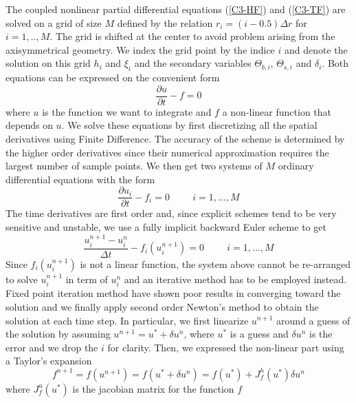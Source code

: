 The coupled nonlinear partial differential equations (\ref{C3-HF}) and
(\ref{C3-TF}) are solved on a grid of size $M$ defined by the relation
$r_i = (i-0.5)\Delta r$ for $i=1,..,M$. The grid is shifted at the center to avoid
problem arising  from the axisymmetrical  geometry. We index  the grid
point by the indice $i$ and denote the solution on this grid $h_i$ and
$\xi_i$ and the secondary variables $\Theta_{b,i}$, $\Theta_{s,i}$ and
$\delta_i$. Both equations can be expressed on the convenient form
\begin{equation}
  \frac{\partial u}{\partial t} - f = 0
\end{equation}
where $u$  is the function we  want to integrate and  $f$ a non-linear
function  that depends  on $u$.   We  solve these  equations by  first
discretizing all the spatial  derivatives using Finite Difference. The
accuracy of the  scheme is determined by the  higher order derivatives
since  their numerical  approximation requires  the largest  number of
sample points. We then get  two systems of $M$ ordinary differential
equations with the form
\begin{equation}
  \frac{\partial u_i}{\partial t} - f_i = 0 \hspace{1cm} i = 1,...,M
\end{equation}
The time derivatives are first  order and, since explicit schemes tend
to be  very sensitive and unstable,  we use a fully  implicit backward
Euler scheme to get
\begin{equation}
  \frac{u_i^{n+1}-u_i^n}{\Delta t} - f_i(u_i^{n+1}) = 0 \hspace{1cm} i
  = 1,...,M
\label{C3-Num-1}
\end{equation}
Since  $f_i(u_i^{n+1})$ is  not a  linear function,  the system  above
cannot be re-arranged to solve $u_i^{n+1}$ in term of $u_i^{n}$ and an
iterative method  has to  be employed  instead. Fixed  point iteration
method have shown  poor results in converging toward  the solution and
we finally apply  second order Newton's method to  obtain the solution
at each time step.  In particular, we first linearize $u^{n+1}$ around
a guess  of the solution  by assuming $u^{n+1}=u^*+\delta  u^n$, where
$u^*$ is a guess and $\delta u^n$ is the error and we drop the $i$ for
clarity.   Then, we  expressed the  non-linear part  using a  Taylor's
expansion
\begin{equation}
  f^{n+1}=f(u^{n+1})=f(u^*+\delta
  u^n)=f(u^*)+J^h_{f}(u^*)\delta u^n\nonumber
\end{equation}
where  $J^u_{f}(u^*)$ is  the  jacobian matrix  for  the function  $f$
